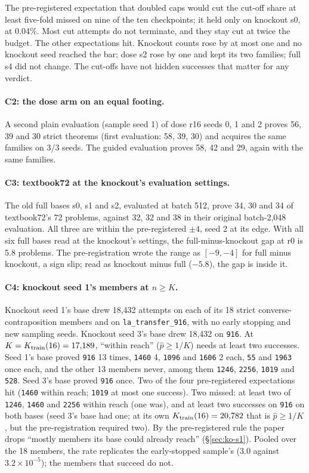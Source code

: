 The pre-registered expectation that doubled caps would cut the cut-off share at least five-fold missed on nine of the
ten checkpoints; it held only on knockout s0, at 0.04\%. Most cut attempts do not terminate, and they stay cut at twice
the budget. The other expectations hit. Knockout counts rose by at most one and no knockout seed reached the bar; dose
s2 rose by one and kept its two families; full s4 did not change. The cut-offs have not hidden successes that matter
for any verdict.

\paragraph{C2: the dose arm on an equal footing.} A second plain evaluation (sample seed 1) of dose r16 seeds 0, 1 and 2
proves 56, 39 and 30 strict theorems (first evaluation: 58, 39, 30) and acquires the same families on 3/3 seeds. The
guided evaluation proves 58, 42 and 29, again with the same families.

\paragraph{C3: textbook72 at the knockout's evaluation settings.} The old full bases s0, s1 and s2, evaluated at batch 512,
prove 34, 30 and 34 of textbook72's 72 problems, against 32, 32 and 38 in their original batch-2,048 evaluation. All
three are within the pre-registered $\pm4$, seed 2 at its edge. With all six full bases read at the knockout's settings,
the full-minus-knockout gap at r0 is 5.8 problems. The pre-registration wrote the range as $[-9, -4]$ for full minus
knockout, a sign slip; read as knockout minus full ($-5.8$), the gap is inside it.

\paragraph{C4: knockout seed 1's members at $n \geq K$.} Knockout seed 1's base drew 18,432 attempts on each of its 18
strict converse-contraposition members and on \texttt{la\_transfer\_916}, with no early stopping and new sampling seeds.
Knockout seed 3's base drew 18,432 on \texttt{916}. At $K = K_{\mathrm{train}}(16) = 17{,}189$, ``within reach'' ($\hat p \geq 1/K$)
needs at least two successes. Seed 1's base proved \texttt{916} 13 times, \texttt{1460} 4, \texttt{1096} and
\texttt{1606} 2 each, \texttt{55} and \texttt{1963} once each, and the other 13 members never, among them
\texttt{1246}, \texttt{2256}, \texttt{1019} and \texttt{528}. Seed 3's base proved \texttt{916} once. Two of the four
pre-registered expectations hit (\texttt{1460} within reach; \texttt{1019} at most one success). Two missed: at least
two of \texttt{1246}, \texttt{1460} and \texttt{2256} within reach (one was), and at least two successes on \texttt{916}
on both bases (seed 3's base had one; at its own $K_{\mathrm{train}}(16) = 20{,}782$ that is $\hat p \geq 1/K$, but the
pre-registration required two). By the pre-registered rule the paper drops ``mostly members its base could already reach''
(\S\ref{sec:ko-s1}). Pooled over the 18 members, the rate replicates the early-stopped sample's ($3.0$ against
$3.2\times10^{-5}$); the members that succeed do not.

